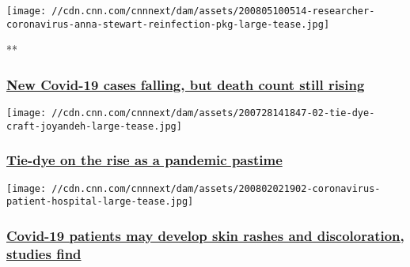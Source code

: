 \href{/videos/health/2020/08/05/coronavirus-wrap-new-cases-death-jones-dnt-lead-vpx.cnn}{}

\texttt{[image: //cdn.cnn.com/cnnnext/dam/assets/200805100514-researcher-coronavirus-anna-stewart-reinfection-pkg-large-tease.jpg]}

**

\hypertarget{new-covid-19-cases-falling-but-death-count-still-rising}{%
\subsubsection{\texorpdfstring{\href{/videos/health/2020/08/05/coronavirus-wrap-new-cases-death-jones-dnt-lead-vpx.cnn}{New
Covid-19 cases falling, but death count still
rising}}{New Covid-19 cases falling, but death count still rising}}\label{new-covid-19-cases-falling-but-death-count-still-rising}}

\href{/2020/08/02/health/tie-dye-craft-hobby-quarantine-wellness/index.html}{}

\texttt{[image: //cdn.cnn.com/cnnnext/dam/assets/200728141847-02-tie-dye-craft-joyandeh-large-tease.jpg]}

\hypertarget{tie-dye-on-the-rise-as-a-pandemic-pastime}{%
\subsubsection{\texorpdfstring{\href{/2020/08/02/health/tie-dye-craft-hobby-quarantine-wellness/index.html}{Tie-dye
on the rise as a pandemic
pastime}}{Tie-dye on the rise as a pandemic pastime}}\label{tie-dye-on-the-rise-as-a-pandemic-pastime}}

\href{/2020/08/05/health/covid-skin-symptoms-wellness/index.html}{}

\texttt{[image: //cdn.cnn.com/cnnnext/dam/assets/200802021902-coronavirus-patient-hospital-large-tease.jpg]}

\hypertarget{covid-19-patients-may-develop-skin-rashes-and-discoloration-studies-find-}{%
\subsubsection{\texorpdfstring{\href{/2020/08/05/health/covid-skin-symptoms-wellness/index.html}{Covid-19
patients may develop skin rashes and discoloration, studies find
}}{Covid-19 patients may develop skin rashes and discoloration, studies find }}\label{covid-19-patients-may-develop-skin-rashes-and-discoloration-studies-find-}}

\href{/2020/08/05/health/weed-marijuana-heart-wellness/index.html}{}

